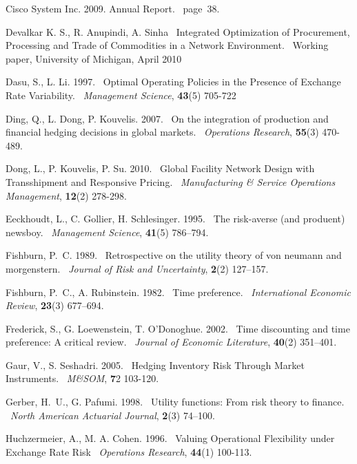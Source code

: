 \documentclass[mnsc,nonblindrev,copyedit]{informs2_wz} %
\def\newblock{\ }%
\begin{document}
\begin{thebibliography}{1}
Cisco System Inc. 2009. Annual Report.
\newblock page~38.



Devalkar K. S., R. Anupindi, A. Sinha
\newblock Integrated Optimization of Procurement, Processing and Trade of Commodities in a Network Environment.
\newblock Working paper, University of Michigan, April 2010


Dasu, S., L. Li. 1997.
\newblock Optimal Operating Policies in the Presence of Exchange Rate Variability.
\newblock {\em Management Science}, {\bf 43}(5) 705-722

Ding, Q., L. Dong, P. Kouvelis. 2007.
\newblock On the integration of production and financial hedging decisions in
  global markets.
\newblock {\em Operations Research}, {\bf 55}(3) 470-489.

Dong, L., P. Kouvelis, P. Su. 2010.
\newblock Global Facility Network Design with Transshipment and Responsive Pricing.
\newblock {\em Manufacturing \& Service Operations Management}, {\bf 12}(2) 278-298.


Eeckhoudt, L., C. Gollier, H. Schlesinger. 1995.
\newblock The risk-averse (and produent) newsboy.
\newblock {\em Management Science}, {\bf 41}(5) 786--794.

Fishburn, P.~C. 1989.
\newblock Retrospective on the utility theory of von neumann and morgenstern.
\newblock {\em Journal of Risk and Uncertainty}, {\bf 2}(2) 127--157.

Fishburn, P.~C., A. Rubinstein. 1982.
\newblock Time preference.
\newblock {\em International Economic Review}, {\bf 23}(3) 677--694.

Frederick, S., G. Loewenstein, T. O'Donoghue. 2002.
\newblock Time discounting and time preference: A critical review.
\newblock {\em Journal of Economic Literature}, {\bf 40}(2) 351--401.

Gaur, V., S. Seshadri. 2005.
\newblock Hedging Inventory Risk Through Market Instruments.
\newblock {\em M\&SOM}, {\bf 7}{2} 103-120.

Gerber, H.~U., G. Pafumi. 1998.
\newblock Utility functions: From risk theory to finance.
\newblock {\em North American Actuarial Journal}, {\bf 2}(3) 74--100.

Huchzermeier, A., M. A. Cohen. 1996.
\newblock Valuing Operational Flexibility under Exchange Rate Risk
\newblock {\em Operations Research}, {\bf 44}(1) 100-113.


\end{thebibliography}
\end{document}

